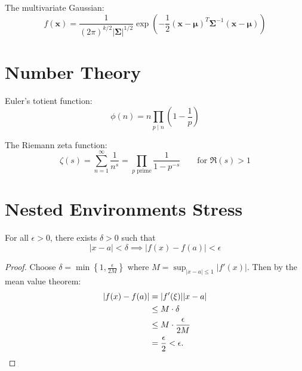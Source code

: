 \documentclass[letterpaper]{article}
\begin{document}
The multivariate Gaussian:
\[
    f(\bm{x}) = \frac{1}{(2\pi)^{k/2} |\bm{\Sigma}|^{1/2}}
    \exp\left(-\frac{1}{2}(\bm{x} - \bm{\mu})^T \bm{\Sigma}^{-1} (\bm{x} - \bm{\mu})\right)
\]

\section{Number Theory}
Euler's totient function:
\[
    \phi(n) = n \prod_{p \mid n} \left(1 - \frac{1}{p}\right)
\]

The Riemann zeta function:
\[
    \zeta(s) = \sum_{n=1}^{\infty} \frac{1}{n^s}
    = \prod_{p \text{ prime}} \frac{1}{1 - p^{-s}}
    \qquad \text{for } \Re(s) > 1
\]

\section{Nested Environments Stress}
\begin{theorem}
For all $\epsilon > 0$, there exists $\delta > 0$ such that
\[
    |x - a| < \delta \implies |f(x) - f(a)| < \epsilon
\]
\end{theorem}

\begin{proof}
Choose $\delta = \min\left\{1, \frac{\epsilon}{2M}\right\}$ where $M = \sup_{|x-a| \leq 1} |f'(x)|$.
Then by the mean value theorem:
\begin{align*}
    |f(x) - f(a)| &= |f'(\xi)||x - a| \\
                   &\leq M \cdot \delta \\
                   &\leq M \cdot \frac{\epsilon}{2M} \\
                   &= \frac{\epsilon}{2} < \epsilon. \qedhere
\end{align*}
\end{proof}
\end{document}
